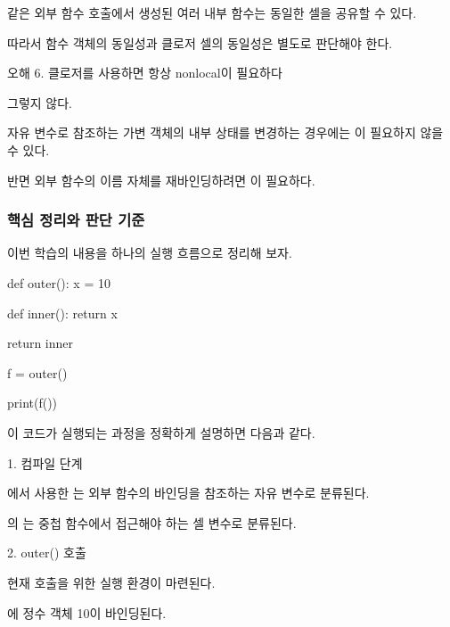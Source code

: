 같은 외부 함수 호출에서 생성된 여러 내부 함수는 동일한 셀을 공유할 수 있다.

따라서 함수 객체의 동일성과 클로저 셀의 동일성은 별도로 판단해야 한다.

\begin{dhknote}
\begin{dhksmry}[centered]
오해 6. 클로저를 사용하면 항상 nonlocal이 필요하다
\end{dhksmry}
\end{dhknote}

그렇지 않다.

자유 변수로 참조하는 가변 객체의 내부 상태를 변경하는 경우에는 이 필요하지 않을 수 있다.

반면 외부 함수의 이름 자체를 재바인딩하려면 이 필요하다.

\subsubsection{핵심 정리와 판단 기준}

이번 학습의 내용을 하나의 실행 흐름으로 정리해 보자.

\begin{dhkcode}
def outer():
    x = 10

    def inner():
        return x

    return inner


f = outer()

print(f())
\end{dhkcode}

이 코드가 실행되는 과정을 정확하게 설명하면 다음과 같다.

\begin{dhknote}
\begin{dhksmry}[centered]
1. 컴파일 단계
\end{dhksmry}
\end{dhknote}

에서 사용한 는 외부 함수의 바인딩을 참조하는 자유 변수로 분류된다.

의 는 중첩 함수에서 접근해야 하는 셀 변수로 분류된다.

\begin{dhknote}
\begin{dhksmry}[centered]
2. outer() 호출
\end{dhksmry}
\end{dhknote}

현재 호출을 위한 실행 환경이 마련된다.

에 정수 객체 10이 바인딩된다.

